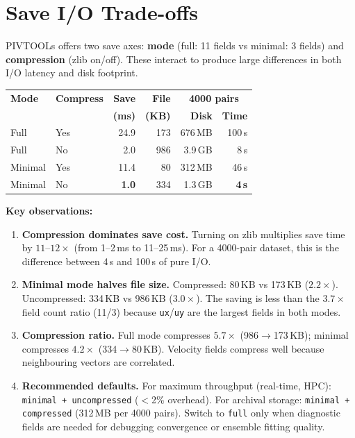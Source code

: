\documentclass[10pt,a4paper,twocolumn]{article}
\begin{document}
\section{Save I/O Trade-offs}
\label{sec:saveio}

PIVTOOLs offers two save axes: \textbf{mode} (full: 11 fields vs minimal: 3 fields) and \textbf{compression} (zlib on/off). These interact to produce large differences in both I/O latency and disk footprint.

\begin{center}
\small
\begin{tabular}{@{}llrrrr@{}}
\toprule
\textbf{Mode} & \textbf{Compress} & \textbf{Save} & \textbf{File} & \multicolumn{2}{c}{\textbf{4000 pairs}} \\
 & & \textbf{(ms)} & \textbf{(KB)} & \textbf{Disk} & \textbf{Time} \\
\midrule
Full     & Yes & 24.9 & 173  & 676\,MB & 100\,s \\
Full     & No  & 2.0  & 986  & 3.9\,GB & 8\,s \\
Minimal  & Yes & 11.4 & 80   & 312\,MB & 46\,s \\
Minimal  & No  & \textbf{1.0}  & 334  & 1.3\,GB & \textbf{4\,s} \\
\bottomrule
\end{tabular}
\end{center}

\textbf{Key observations:}

\begin{enumerate}[leftmargin=1.4em]
\item \textbf{Compression dominates save cost.} Turning on zlib multiplies save time by $11\text{--}12\times$ (from 1--2\,ms to 11--25\,ms). For a 4000-pair dataset, this is the difference between 4\,s and 100\,s of pure I/O.

\item \textbf{Minimal mode halves file size.} Compressed: 80\,KB vs 173\,KB ($2.2\times$). Uncompressed: 334\,KB vs 986\,KB ($3.0\times$). The saving is less than the $3.7\times$ field count ratio (11/3) because \texttt{ux}/\texttt{uy} are the largest fields in both modes.

\item \textbf{Compression ratio.} Full mode compresses $5.7\times$ (986$\to$173\,KB); minimal compresses $4.2\times$ (334$\to$80\,KB). Velocity fields compress well because neighbouring vectors are correlated.

\item \textbf{Recommended defaults.} For maximum throughput (real-time, HPC): \texttt{minimal + uncompressed} ($<$2\% overhead). For archival storage: \texttt{minimal + compressed} (312\,MB per 4000 pairs). Switch to \texttt{full} only when diagnostic fields are needed for debugging convergence or ensemble fitting quality.
\end{enumerate}
\end{document}
